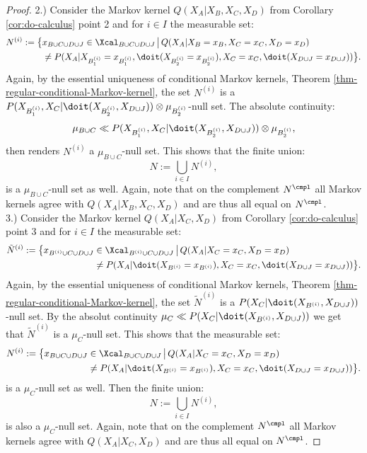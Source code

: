 \begin{Cor}
\begin{proof}
2.) Consider the Markov kernel $Q(X_A|X_B,X_C,X_D)$ from Corollary \ref{cor:do-calculus} point 2
    and for $i \in I$ the measurable set:
\begin{align*}
     N^{(i)} :=  \bigl\{ & x_{B \cup C \cup D \cup J} \in \Xcal_{B \cup C \cup D \cup J} \,\big|\,
        Q(X_A|X_B=x_B,X_C=x_C,X_D=x_D)\\ 
       &\neq P(X_A|X_{B_1^{(i)}}=x_{B_1^{(i)}},\doit(X_{B_2^{(i)}}=x_{B_2^{(i)}}),X_C=x_C,\doit(X_{D\cup J}=x_{D\cup J}))  \bigr\}.
\end{align*}
Again, by the essential uniqueness of conditional Markov kernels, Theorem \ref{thm-regular-conditional-Markov-kernel}, the set $N^{(i)}$ is 
a $P(X_{B_1^{(i)}},X_C|\doit(X_{B_2^{(i)}},X_{D\cup J})) \otimes \mu_{B_2^{(i)}}$-null set.
The absolute continuity:
 \[ \mu_{B \cup C} \ll  P(X_{B_1^{(i)}},X_C|\doit(X_{B_2^{(i)}},X_{D\cup J})) \otimes \mu_{B_2^{(i)}}, \]
 then renders $N^{(i)}$ a $\mu_{B \cup C}$-null set. This shows that the finite union:
 \[ N := \bigcup_{i \in I} N^{(i)}, \]
 is a $\mu_{B \cup C}$-null set as well.  Again, note that on the complement $N^\cmpl$ all Markov kernels agree with $Q(X_A|X_B,X_C,X_D)$ and are thus all equal on $N^\cmpl$. \\

3.) Consider the Markov kernel $Q(X_A|X_C,X_D)$ from Corollary \ref{cor:do-calculus} point 3 and
for $i \in I$ the measurable set:
\begin{align*}
    \tilde N^{(i)} := \bigl\{ x_{B^{(i)} \cup C \cup D \cup J} &\in \Xcal_{B^{(i)} \cup C \cup D \cup J} \,\big|\,
        Q(X_A|X_C=x_C,X_D=x_D)\\ 
       &\neq P(X_A|\doit(X_{B^{(i)}}=x_{B^{(i)}}),X_C=x_C,\doit(X_{D\cup J}=x_{D \cup J})) \bigr\}.
\end{align*}
Again, by the essential uniqueness of conditional Markov kernels, Theorem \ref{thm-regular-conditional-Markov-kernel}, the set $\tilde N^{(i)}$ is a $P(X_C|\doit(X_{B^{(i)}},X_{D\cup J}))$-null set. By the absolut continuity $ \mu_C \ll P(X_C|\doit(X_{B^{(i)}},X_{D\cup J}))$ we get that $\tilde N^{(i)}$ is a $\mu_C$-null set. This shows that the measurable set:
\begin{align*}
    N^{(i)} := \bigl\{ x_{B \cup C \cup D \cup J} &\in \Xcal_{B \cup C \cup D \cup J} \,\big|\,
        Q(X_A|X_C=x_C,X_D=x_D)\\ 
       &\neq P(X_A|\doit(X_{B^{(i)}}=x_{B^{(i)}}),X_C=x_C,\doit(X_{D\cup J}=x_{D \cup J})) \bigr\}.
\end{align*}
is a $\mu_C$-null set as well. Then the finite union:
 \[ N := \bigcup_{i \in I} N^{(i)}, \]
 is also a $\mu_C$-null set. 
Again, note that on the complement $N^\cmpl$ all Markov kernels agree with $Q(X_A|X_C,X_D)$ and are thus all equal on $N^\cmpl$.
\end{proof}
\end{Cor}


